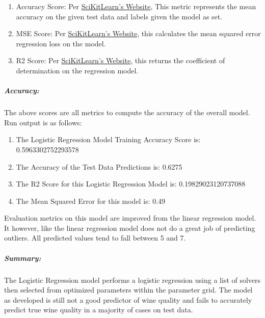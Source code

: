 \documentclass[11pt]{article}
\providecommand{\tightlist}{%
      \setlength{\itemsep}{0pt}\setlength{\parskip}{0pt}}
\begin{document}
\begin{enumerate}
\def\labelenumi{\arabic{enumi}.}
\setcounter{enumi}{1}
\item
  Accuracy Score: Per
  \href{https://scikit-learn.org/stable/modules/generated/sklearn.linear_model.LogisticRegression.html\#sklearn.linear_model.LogisticRegression.score}{SciKitLearn's
  Website}, This metric represents the mean accuracy on the given test
  data and labels given the model as set.
\item
  MSE Score: Per
  \href{https://scikit-learn.org/stable/modules/generated/sklearn.metrics.root_mean_squared_error.html\#sklearn.metrics.root_mean_squared_error}{SciKitLearn's
  Website}, this calculates the mean squared error regression loss on
  the model.
\item
  R2 Score: Per
  \href{https://scikit-learn.org/stable/modules/generated/sklearn.metrics.r2_score.html\#sklearn.metrics.r2_score}{SciKitLearn's
  Website}, this returns the coefficient of determination on the
  regression model.
\end{enumerate}

\hypertarget{accuracy-1}{%
\subparagraph{Accuracy:}\label{accuracy-1}}

The above scores are all metrics to compute the accuracy of the overall
model. Run output is as follows:

\begin{enumerate}
\def\labelenumi{\arabic{enumi}.}
\tightlist
\item
  The Logistic Regression Model Training Accuracy Score is:
  0.5963302752293578
\item
  The Accuracy of the Test Data Predictions is: 0.6275
\item
  The R2 Score for this Logistic Regression Model is:
  0.19829023120737088
\item
  The Mean Squared Error for this model is: 0.49
\end{enumerate}

Evaluation metrics on this model are improved from the linear regression
model. It however, like the linear regression model does not do a great
job of predicting outliers. All predicted values tend to fall between 5
and 7.

\hypertarget{summary-1}{%
\subparagraph{Summary:}\label{summary-1}}

The Logistic Regression model performs a logistic regression using a
list of solvers then selected from optimized parameters within the
parameter grid. The model as developed is still not a good predictor of
wine quality and fails to accurately predict true wine quality in a
majority of cases on test data.
\end{document}
